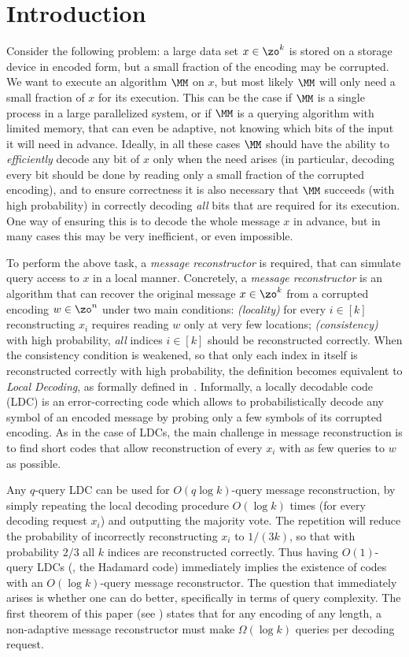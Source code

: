 \section{Introduction}

Consider the following problem: a large data set $x \in \zo^k$ is stored on a
storage device in encoded form, but a small fraction of the encoding
may be corrupted. We want to execute an algorithm $\MM$ on $x$, but most likely $\MM$ will only need a
small fraction of $x$ for its execution. This can be the case if $\MM$ is a single process in a large parallelized system, or if $\MM$ is a querying algorithm with limited memory, that can even be adaptive, not knowing which bits of the input it will need in advance.
Ideally, in all these cases $\MM$ should have the ability to \emph{efficiently} decode any bit of $x$ only when the need arises (in particular, decoding every bit should be done by reading only a small fraction of the corrupted encoding), and to ensure correctness it is also necessary that $\MM$
succeeds (with high probability) in correctly decoding \emph{all} bits that are
 required for its execution.
One way of ensuring this is to decode the whole message $x$ in advance, but in many cases this may be very inefficient, or even impossible.

To perform the above task, a \emph{message reconstructor} is required, that can simulate query access to $x$ in a local manner. Concretely, a \emph{message reconstructor} is an algorithm that can recover the original
message $x\in \zo^k$ from a corrupted encoding $w \in \zo^n$ under two main conditions: \emph{(locality)} for every $i \in [k]$ reconstructing $x_i$ requires reading $w$ only at very few locations; \emph{(consistency)} with high probability, \emph{all} indices $i \in [k]$ should be reconstructed correctly.
When the consistency condition is weakened, so that only each index
in itself is reconstructed correctly with high probability, the
definition becomes equivalent to \emph{Local Decoding}, as formally defined in~\cite{katz-trevisan}.
Informally, a locally decodable code (LDC) is an error-correcting code which allows to probabilistically decode any
symbol of an encoded message by probing only a few symbols of its corrupted encoding.
As in the case of LDCs, the main challenge in message reconstruction is to find short codes that allow reconstruction of every $x_i$ with as few queries to $w$ as possible.

Any $q$-query LDC can be used for $O(q \log k)$-query message reconstruction, by simply repeating the local decoding procedure
$O(\log k)$ times (for every decoding request $x_i$) and outputting the majority vote. The repetition will reduce the  probability of incorrectly reconstructing $x_i$ to $1/(3k)$, so that with probability  $2/3$ all $k$ indices are reconstructed correctly. Thus having $O(1)$-query LDCs (\eg, the Hadamard code) immediately implies the existence of codes with an $O(\log k)$-query message reconstructor. The question that immediately arises is whether one can do better, specifically in terms of query complexity. The first theorem of this paper (see ) states that for any encoding of any length, a non-adaptive message reconstructor must make $\Omega( \log k)$ queries per decoding request.

